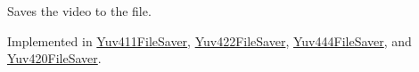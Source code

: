 Saves the video to the file. 



Implemented in \hyperlink{classGUI_1_1Player_1_1Yuv411FileSaver_aae2c382151ef7c9aa913361172b30db6}{Yuv411\+File\+Saver}, \hyperlink{classGUI_1_1Player_1_1Yuv422FileSaver_aae2c382151ef7c9aa913361172b30db6}{Yuv422\+File\+Saver}, \hyperlink{classGUI_1_1Player_1_1Yuv444FileSaver_aae2c382151ef7c9aa913361172b30db6}{Yuv444\+File\+Saver}, and \hyperlink{classGUI_1_1Player_1_1Yuv420FileSaver_aae2c382151ef7c9aa913361172b30db6}{Yuv420\+File\+Saver}.

